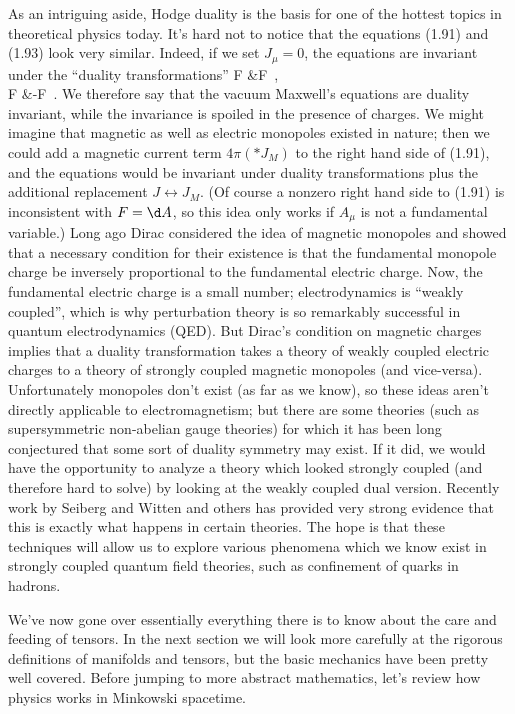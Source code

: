 As an intriguing aside, Hodge duality is the basis for one of the hottest
topics in theoretical physics today.  It's hard not to notice that the
equations (1.91) and (1.93) look very similar.  Indeed, if we set $J_\mu=0$,
the equations are invariant under the ``duality transformations''
\bea
  F &\rightarrow \ast F\ ,\nonumber \\
  \ast F &\rightarrow -F\ .  \label{1.94}
\eea
We therefore say that the vacuum Maxwell's equations are duality
invariant, while the invariance is spoiled in the presence of charges.
We might imagine that magnetic as well as electric monopoles existed in
nature; then we could add a magnetic current term $4\pi(*J_M)$ to the
right hand side of (1.91), and the equations would be invariant under duality
transformations plus the additional replacement $J \leftrightarrow J_M$.
(Of course a nonzero right hand side to (1.91) is inconsistent with $F=\d A$,
so this idea only works if $A_\mu$ is not a fundamental variable.)
Long ago Dirac considered the idea of magnetic monopoles and showed that
a necessary condition for their existence is that the fundamental
monopole charge be inversely proportional to the fundamental electric
charge.  Now, the fundamental electric charge is a small number;
electrodynamics is ``weakly coupled'', which is why perturbation theory
is so remarkably successful in quantum electrodynamics (QED).  But
Dirac's condition on magnetic charges implies that a duality 
transformation takes a theory of weakly coupled electric charges to
a theory of strongly coupled magnetic monopoles (and vice-versa).
Unfortunately monopoles don't exist (as far as we know), so these
ideas aren't directly applicable to electromagnetism; but there are
some theories (such as supersymmetric non-abelian gauge theories) for
which it has been long conjectured that some sort of duality symmetry
may exist.  If it did, we would have the opportunity to analyze a 
theory which looked strongly coupled (and therefore hard to solve) by
looking at the weakly coupled dual version.  Recently work by Seiberg 
and Witten and others has provided very strong evidence that this is
exactly what happens in certain theories.  The hope is that these
techniques will allow us to explore various phenomena which we know
exist in strongly coupled quantum field theories, such as confinement
of quarks in hadrons.

We've now gone over essentially everything there is to know about the
care and feeding of tensors.  In the next section we will look more
carefully at the rigorous definitions of manifolds and tensors, but
the basic mechanics have been pretty well covered.  Before jumping
to more abstract mathematics, let's review how
physics works in Minkowski spacetime.


